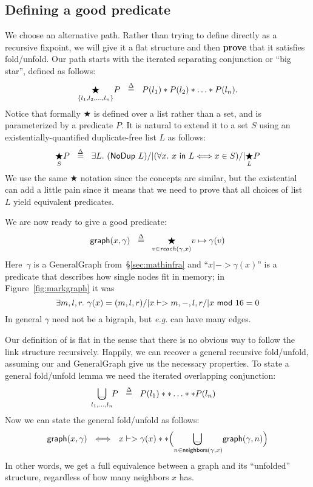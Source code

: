 \subsection{Defining a good  predicate}\label{sec:goodgraph}

We choose an alternative path.  Rather than trying to define  directly as a recursive fixpoint, we will give it a flat structure and then \textbf{prove} that it satisfies fold/unfold.  Our path starts with the iterated separating conjunction or ``big star'', defined as follows:
\begin{equation*}
  \underset{\{l_1, l_2,\dots,l_n\}}{\bigstar}P ~~ \mathbin{\stackrel{\Delta}{=}} ~~ P(l_1) *
  P(l_2) * \dots * P(l_n).
\end{equation*}
Notice that formally $\bigstar$ is defined over a list rather than a set, and is parameterized by a predicate $P$.  It is natural to extend it to a set $S$ using an existentially-quantified duplicate-free list $L$ as follows:
\[
\underset{S}{\bigstar} P ~~ \mathbin{\stackrel{\Delta}{=}} ~~ \exists L.~ (\mathsf{NoDup}\ L) /| (\forall x.~ x\ \mathsf{in}\ L <=> x \in S) /| \underset{L}{\bigstar}P
\]
We use the same $\bigstar$ notation since the concepts are similar, but the existential can add a little pain since it means that we need to prove that all choices of list $L$ yield equivalent predicates.

We are now ready to give a good  predicate:
\begin{equation}\label{eqn:iter_def}
  \mathsf{graph}(x, \gamma) ~~ \mathbin{\stackrel{\Delta}{=}} ~~ \underset{v \in \mathit{reach}(\gamma, x)}{\bigstar} v\mapsto\gamma(v)
\end{equation}
Here~$\gamma$ is a GeneralGraph from~\S\ref{sec:mathinfra} and ``$x |-> \gamma(x)$'' is a predicate that describes how single nodes fit in memory; in Figure~\ref{fig:markgraph} it was
\[
\exists m,l,r.~\gamma(x) = (m,l,r) /| x |-> m,-,l,r /| x\ \mathsf{mod}\ 16 = 0
\]
In general $\gamma$ need not be a bigraph, but \emph{e.g.} can have many edges.

Our definition of  is flat in the sense that there is no obvious way to follow the link structure recursively.  Happily, we can recover a general recursive fold/unfold, assuming our  and GeneralGraph give us the necessary properties.  To state a general fold/unfold lemma we need the iterated overlapping conjunction:
\[
\bigocon_{l_1,\dots,l_n} \!\! P ~~ \defeq ~~ P(l_1) ** \ldots ** P(l_n)
\]
Now we can state the general fold/unfold as follows:
\begin{equation}
\label{eqn:unfold_graph}
\p{graph}(x,\gamma) ~~ <=> ~~ x |-> \gamma(x) ** \Big(\underset{n \in \p{neighbors}(\gamma,x)}{\raisebox{-0.3ex}{\resizebox{0.75em}{!}{$\scon$}} \hspace{-2.45ex} \bigcup} \p{graph}(\gamma,n) \Big)
\end{equation}
In other words, we get a full equivalence between a graph and its ``unfolded'' structure, regardless of how many neighbors $x$ has.

